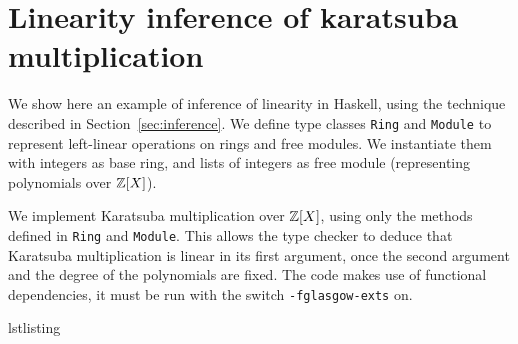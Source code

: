 \chapter{Linearity inference of karatsuba multiplication}
\label{cha:line-infer-karats}

\lstset{language=haskell}

We show here an example of inference of linearity in Haskell, using
the technique described in Section~\ref{sec:inference}. We define type
classes \lstinline{Ring} and \lstinline{Module} to represent
left-linear operations on rings and free modules. We instantiate them
with integers as base ring, and lists of integers as free module
(representing polynomials over $\mathbb{Z}[X]$).

We implement Karatsuba multiplication over $\mathbb{Z}[X]$, using only the
methods defined in \lstinline{Ring} and \lstinline{Module}. This
allows the type checker to deduce that Karatsuba multiplication is
linear in its first argument, once the second argument and the degree
of the polynomials are fixed. The code makes use of functional
dependencies, it must be run with the switch \verb|-fglasgow-exts| on.

\begin{xcomment}{lstlisting}

\end{xcomment}


                  

%
